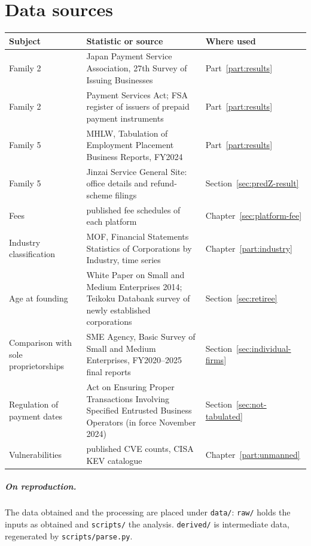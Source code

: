 


\chapter{Data sources}
\label{app:data}

\begin{center}
\begin{tabularx}{\textwidth}{@{}lXl@{}}
\toprule
Subject & Statistic or source & Where used \\
\midrule
Family 2 & Japan Payment Service Association, 27th Survey of Issuing Businesses \cite{jpsa2025} & Part~\ref{part:results} \\
Family 2 & Payment Services Act; FSA register of issuers of prepaid payment instruments & Part~\ref{part:results} \\
Family 5 & MHLW, Tabulation of Employment Placement Business Reports, FY2024 \cite{mhlw2025} & Part~\ref{part:results} \\
Family 5 & Jinzai Service General Site: office details and refund-scheme filings & Section~\ref{sec:predZ-result} \\
Fees & published fee schedules of each platform & Chapter~\ref{sec:platform-fee} \\
Industry classification & MOF, Financial Statements Statistics of Corporations by Industry, time series \cite{mof2025} & Chapter~\ref{part:industry} \\
Age at founding & White Paper on Small and Medium Enterprises 2014; Teikoku Databank survey of newly established corporations & Section~\ref{sec:retiree} \\
Comparison with sole proprietorships & SME Agency, Basic Survey of Small and Medium Enterprises, FY2020--2025 final reports & Section~\ref{sec:individual-firms} \\
Regulation of payment dates & Act on Ensuring Proper Transactions Involving Specified Entrusted Business Operators (in force November 2024) & Section~\ref{sec:not-tabulated} \\
Vulnerabilities & published CVE counts, CISA KEV catalogue & Chapter~\ref{part:unmanned} \\
\bottomrule
\end{tabularx}
\label{tab:data-sources}
\end{center}

\paragraph{On reproduction.}
The data obtained and the processing are placed under \texttt{data/}: \texttt{raw/} holds the
inputs as obtained and \texttt{scripts/} the analysis. \texttt{derived/} is intermediate data,
regenerated by \texttt{scripts/parse.py}.


